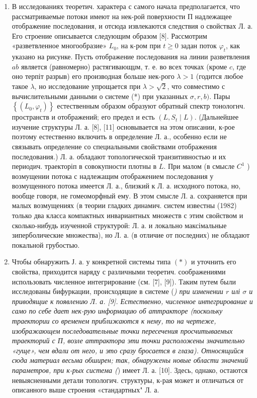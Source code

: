 \documentclass[10pt]{article}
\begin{document}
\begin{enumerate}

  \item В исследованиях теоретич. характера с самого начала предполагается, что рассматриваемые потоки имеют на нек-рой поверхности П надлежащее отображение последования, и отсюда извлекаются следствия о свойствах Л. а. Его строение описывается следующим образом [8]. Рассмотрим «разветвленное многообразие» $L_{0}$, на к-ром при $t \geqslant 0$ задан поток $\varphi_{t}$, как указано на рисунке. Пусть отображение последования на линии разветвления $a b$ является (равномерно) растягивающџм, т. е. во всех точках (кроме $c$, где оно терпіт разрыв) его производная больше нек-рого $\lambda>1$ (годится любое такое $\lambda$, но исследование упрощается при $\lambda>\sqrt{2}$, что совместимо с вычислительными данными о системе (*) при указанных $\sigma, r, b)$. Пары $\left\{\left(L_{0}, \varphi_{t}\right)\right\}$ естественным образом образуют обратный спектр тонологнч. пространств и отображений; его предел и есть $\left(L, S_{t} \mid L\right)$. (Дальнейшее изучение структуры Л. а. [8], [11] основывается на этом описании, к-рое поэтому естественно включить в определение Л. а., особенно если не связывать определение со специалыными свойствами отображения последования.) Л. а. обладают топологической транзитивностью и их периодич. траекторіп в совокупности плотны в $L$. При малом (в смысле $C^{1}$ ) возмущении потока с надлежащим отображением последования у возмущенного потока имеется Л. а., близкий к Л. а. исходного потока, но, вообще говоря, не гомеоморфный ему. В этом смысле Л. а. сохраняется при малых возмущениях (в теории гладких динамич. систем известны (1982) только два класса компактных инвариантных множеств с этим свойством и сколько-нибудь изученной структурой: Л. а. и локально максімальные зиперболические множества), но Л. а. (в отличие от последних) не обладают покальной грубостью.



  \item Чтобы обнаружить Ј. а. у конкретной системы типа $(*)$ и уточнить его свойства, приходится наряду с различными теоретич. соображениями использовать численное интегрирование (см. [7], [9]). Таким путем были исследованы бифуркации, происходящие в системе (\textit{) при изменении $r$ илі $\sigma$ и приводящие к появлению Л. а. [9]. Естественно, численное интегрирование и само по себе дает нек-рую информацию об аттракторе (поскольку траектории со временем приближаются к нему, то на чертеже, изображающем последовательные точки пересечения просчитываемых траекторий с П, возле аттрактора эти точки расположены значительно «гуще», чем вдали от него, и это сразу бросается в глаза). Относящийся сюда материал весьма обширен; так, обнаружены новые области значений параметров, при к-рых система (}) имеет Л. а. [10]. Здесь, однако, остаются невыясненными детали топологич. структуры, к-рая может и отличаться от описанного выше строения «стандартных" Л. а.



\end{enumerate}
\end{document}
